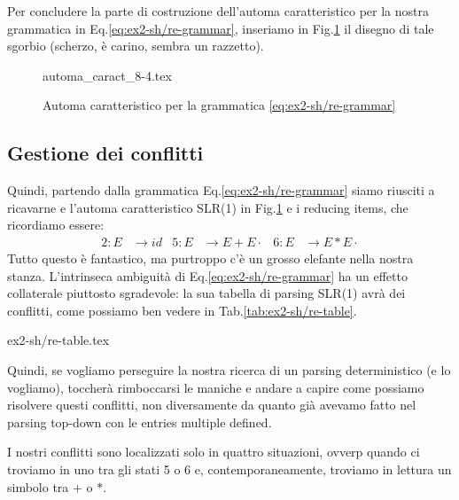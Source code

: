 \documentclass[class=book, crop=false, oneside, 12pt]{standalone}
\begin{document}
Per concludere la parte di costruzione dell'automa caratteristico per la nostra grammatica in Eq.\ref{eq:ex2-sh/re-grammar}, inseriamo in Fig.\ref{fig:ex2-sh-re-automata} il disegno di tale sgorbio (scherzo, è carino, sembra un razzetto).
\begin{figure}[H]
    \center
	{automa_caract_8-4.tex}
    \caption{Automa caratteristico per la grammatica \ref{eq:ex2-sh/re-grammar}}
    \label{fig:ex2-sh-re-automata}
\end{figure}

\subsection{Gestione dei conflitti}
\label{subsec:precedence-conflicts}
Quindi, partendo dalla grammatica Eq.\ref{eq:ex2-sh/re-grammar} siamo riusciti a ricavarne e l'automa caratteristico SLR(1) in Fig.\ref{fig:ex2-sh-re-automata} e i reducing items, che ricordiamo essere:
\begin{align*}
    2: E &\to id & 5: E &\to E + E \cdot & 6: E &\to E * E \cdot
\end{align*}
Tutto questo è fantastico, ma purtroppo c'è un grosso elefante nella nostra stanza. L'intrinseca ambiguità di Eq.\ref{eq:ex2-sh/re-grammar} ha un effetto collaterale piuttosto sgradevole: la sua tabella di parsing SLR(1) avrà dei conflitti, come possiamo ben vedere in Tab.\ref{tab:ex2-sh/re-table}.
\begin{table}[H]
    \centering
    {ex2-sh/re-table.tex}
    \caption{tabella di parsing SLR(1) per la grammatica \ref{eq:ex2-sh/re-grammar}}
    \label{tab:ex2-sh/re-table}
\end{table}
\noindent Quindi, se vogliamo perseguire la nostra ricerca di un parsing deterministico (e lo vogliamo), toccherà rimboccarsi le maniche e andare a capire come possiamo risolvere questi conflitti, non diversamente da quanto già avevamo fatto nel parsing top-down con le entries multiple defined.

I nostri conflitti sono localizzati solo in quattro situazioni, ovverp quando ci troviamo in uno tra gli stati 5 o 6 e, contemporaneamente, troviamo in lettura un simbolo tra \(+\) o \(\ast\).
\end{document}
